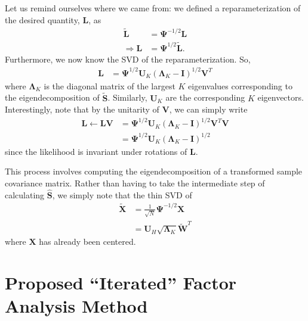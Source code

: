 \documentclass[12pt]{article}
\begin{document}
Let us remind ourselves where we came from: we defined a reparameterization of the desired quantity, $\mathbf{L}$, as 
\begin{align}
	\tilde{\mathbf{L}} &= \boldsymbol{\Psi}^{-1/2} \mathbf{L}  \\
	\Rightarrow \mathbf{L} &= \boldsymbol{\Psi}^{1/2} \tilde{\mathbf{L}}.
\end{align}
Furthermore, we now know the SVD of the reparameterization. So, 
\begin{align}
	\mathbf{L} &= \boldsymbol{\Psi}^{1/2} \mathbf{U}_K \left(\boldsymbol{\Lambda}_K - \mathbf{I}\right)^{1/2} \mathbf{V}^T
\end{align}
where $\boldsymbol{\Lambda}_K$ is the diagonal matrix of the largest $K$ eigenvalues corresponding to the eigendecomposition of $\tilde{\boldsymbol{S}}$. Similarly, $\mathbf{U}_K$ are the corresponding $K$ eigenvectors. Interestingly, note that by the unitarity of $\mathbf{V}$, we can simply write
\begin{align}
	\mathbf{L} \leftarrow \mathbf{L}\mathbf{V} &= \boldsymbol{\Psi}^{1/2} \mathbf{U}_K \left(\boldsymbol{\Lambda}_K - \mathbf{I}\right)^{1/2} \mathbf{V}^T \mathbf{V} \\
	&= \boldsymbol{\Psi}^{1/2} \mathbf{U}_K \left(\boldsymbol{\Lambda}_K - \mathbf{I}\right)^{1/2}
\end{align}
since the likelihood is invariant under rotations of $\mathbf{L}$. 

This process involves computing the eigendecomposition of a transformed sample covariance matrix. Rather than having to take the intermediate step of calculating $\hat{\mathbf{S}}$, we simply note that the thin SVD of 
\begin{align}
	\tilde{\mathbf{X}} &= \frac{1}{\sqrt{N}} \boldsymbol{\Psi}^{-1/2} \mathbf{X} \\
	&= \mathbf{U}_H \sqrt{\boldsymbol{\Lambda}_K} \tilde{\mathbf{W}}^T
\end{align}
where $\mathbf{X}$ has already been centered.
\section{Proposed ``Iterated'' Factor Analysis Method}
\end{document}
